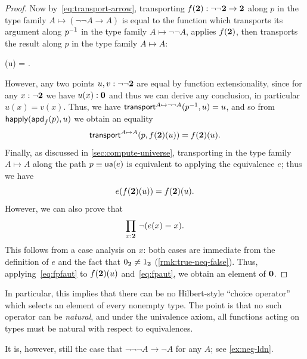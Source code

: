 \begin{proof}
  Now by~\eqref{eq:transport-arrow}, transporting $f(\mathbf{2}):\neg\neg\mathbf{2}\to\mathbf{2}$ along $p$ in the type family ${A\mapsto (\neg\neg A \to A)}$ is equal to the function which transports its argument along $\mathord{{p}^{-1}}$ in the type family $A\mapsto \neg\neg A$, applies $f(\mathbf{2})$, then transports the result along $p$ in the type family $A\mapsto A$:
  \begin{narrowmultline*}
    (u) =
    \narrowbreak
    .
  \end{narrowmultline*}
  However, any two points $u,v:\neg\neg\mathbf{2}$ are equal by function extensionality, since for any $x:\neg\mathbf{2}$ we have $u(x):\mathbf{0}$ and thus we can derive any conclusion, in particular $u(x)=v(x)$.
  Thus, we have $\mathsf{transport}^{A\mapsto \neg\neg A}(\mathord{{p}^{-1}},u) = u$, and so from $\mathsf{happly}(\mathsf{apd}_{f}\mathopen{}\left(p\right)\mathclose{},u)$ we obtain an equality
  \[ \mathsf{transport}^{A\mapsto A}(p,f(\mathbf{2})(u)) = f(\mathbf{2})(u).\]
  Finally, as discussed in \cref{sec:compute-universe}, transporting in the type family $A\mapsto A$ along the path $p\equiv \mathsf{ua}(e)$ is equivalent to applying the equivalence $e$; thus we have
  \begin{equation}
    e(f(\mathbf{2})(u)) = f(\mathbf{2})(u).\label{eq:fpaut}
  \end{equation}
  However, we can also prove that
  \begin{equation}
    \prd{x:\bool} \neg(e(x)=x).\label{eq:fpfaut}
  \end{equation}
  This follows from a case analysis on $x$: both cases are immediate from the definition of $e$ and the fact that ${0_{\mathbf{2}}}\neq{1_{\ensuremath{\mathbf{2}}}}$ (\cref{rmk:true-neq-false}).
  Thus, applying~\eqref{eq:fpfaut} to $f(\mathbf{2})(u)$ and~\eqref{eq:fpaut}, we obtain an element of $\mathbf{0}$.
\end{proof}

\begin{rmk}
  In particular, this implies that there can be no Hilbert-style ``choice operator'' which selects an element of every nonempty type.
  The point is that no such operator can be \emph{natural}, and under the univalence axiom, all functions acting on types must be natural with respect to equivalences.
\end{rmk}

\begin{rmk}
  It is, however, still the case that $\neg\neg\neg A \to \neg A$ for any $A$; see \cref{ex:neg-ldn}.
\end{rmk}

